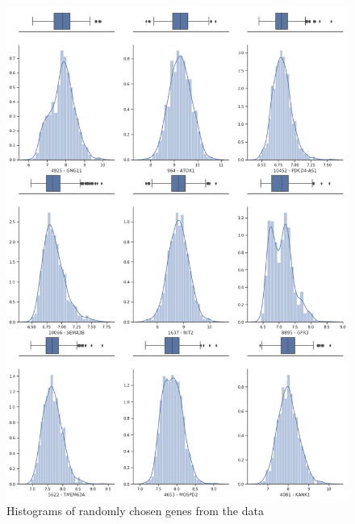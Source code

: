 \documentclass[shortabstract, english, mgr]{iithesis}
\begin{document}
\begin{figure}
\centering
\includegraphics[width=\textwidth]{images/hists_normal.png}
\caption{Histograms of randomly chosen genes from the data}
\label{fig:hists_norm}
\end{figure}
\end{document}
